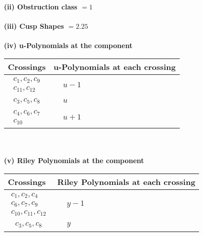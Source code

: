\documentclass[1p]{elsarticle_modified}
\theoremstyle{definition}
\begin{document}
\flushleft \textbf{(ii) Obstruction class $= 1$}\\~\\
\flushleft \textbf{(iii) Cusp Shapes $= 2.25$}\\~\\
\newpage\renewcommand{\arraystretch}{1}
\flushleft \textbf{(iv) u-Polynomials at the component}\newline \\
\begin{tabular}{m{50pt}|m{274pt}}
Crossings & \hspace{64pt}u-Polynomials at each crossing \\
\hline $$\begin{aligned}c_{1},c_{2},c_{9}\\c_{11},c_{12}\end{aligned}$$&$\begin{aligned}
&u-1
\end{aligned}$\\
\hline $$\begin{aligned}c_{3},c_{5},c_{8}\end{aligned}$$&$\begin{aligned}
&u
\end{aligned}$\\
\hline $$\begin{aligned}c_{4},c_{6},c_{7}\\c_{10}\end{aligned}$$&$\begin{aligned}
&u+1
\end{aligned}$\\
\hline
\end{tabular}\\~\\
\newpage\renewcommand{\arraystretch}{1}
\flushleft \textbf{(v) Riley Polynomials at the component}\newline \\
\begin{tabular}{m{50pt}|m{274pt}}
Crossings & \hspace{64pt}Riley Polynomials at each crossing \\
\hline $$\begin{aligned}c_{1},c_{2},c_{4}\\c_{6},c_{7},c_{9}\\c_{10},c_{11},c_{12}\end{aligned}$$&$\begin{aligned}
&y-1
\end{aligned}$\\
\hline $$\begin{aligned}c_{3},c_{5},c_{8}\end{aligned}$$&$\begin{aligned}
&y
\end{aligned}$\\
\hline
\end{tabular}\\~\\
\end{document}
